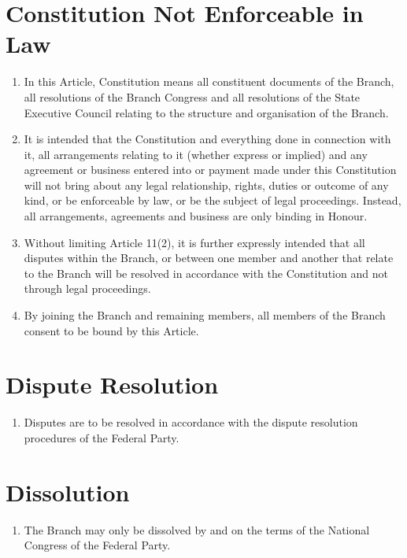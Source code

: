 \documentclass[a4paper,titlepage,8.5pt]{article}
\newcommand{\stateorterritory}{State}
\begin{document}
\section{Constitution Not Enforceable in Law}

\begin{enumerate}
\item In this Article, Constitution means all constituent documents of the Branch, all resolutions of the Branch Congress and all resolutions of the {\stateorterritory} Executive Council relating to the structure and organisation of the Branch.
\item It is intended that the Constitution and everything done in connection with it, all arrangements relating to it (whether express or implied) and any agreement or business entered into or payment made under this Constitution will not bring about any legal relationship, rights, duties or outcome of any kind, or be enforceable by law, or be the subject of legal proceedings. Instead, all arrangements, agreements and business are only binding in Honour.
\item Without limiting Article 11(2), it is further expressly intended that all disputes within the Branch, or between one member and another that relate to the Branch will be resolved in accordance with the Constitution and not through legal proceedings.
\item By joining the Branch and remaining members, all members of the Branch consent to be bound by this Article.
\end{enumerate}

\section{Dispute Resolution}

\begin{enumerate}
\item Disputes are to be resolved in accordance with the dispute resolution procedures of the Federal Party.
\end{enumerate}

\section{Dissolution}

\begin{enumerate}
\item The Branch may only be dissolved by and on the terms of the National Congress of the Federal Party.
\end{enumerate}
\end{document}
